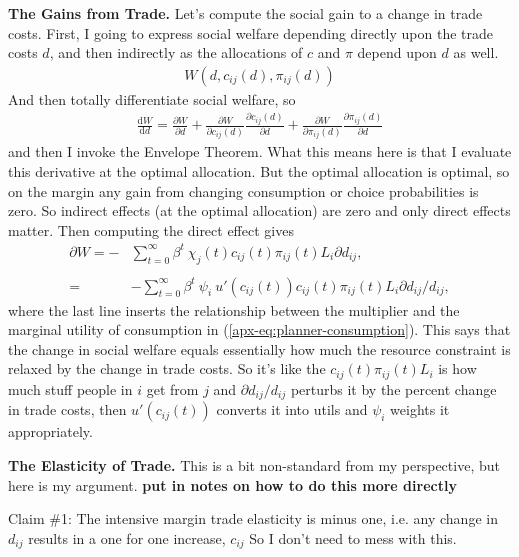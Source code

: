 \documentclass[12pt,pdftex]{article}
\begin{document}
\begin{onehalfspacing}
\textbf{The Gains from Trade.} Let's compute the social gain to a change in trade costs. First, I going to express social welfare depending directly upon the trade costs $d$, and then indirectly as the allocations of $c$ and $\pi$ depend upon $d$ as well.
\begin{align}
W(d, c_{ij}(d), \pi_{ij}(d))
\end{align}
And then totally differentiate social welfare, so
\begin{align}
\frac{\mathrm{d} W}{\mathrm{d}d} = \frac{\partial W}{\partial d} + \frac{\partial W}{\partial c_{ij}(d)}\frac{\partial c_{ij}(d)}{\partial d} + \frac{\partial W}{\partial \pi_{ij}(d)}\frac{\partial \pi_{ij}(d)}{\partial d}
\end{align}
and then I invoke the Envelope Theorem. What this means here is that I evaluate this derivative at the optimal allocation. But the optimal allocation is optimal, so on the margin any gain from changing consumption or choice probabilities is zero. So indirect effects (at the optimal allocation) are zero and only direct effects matter. Then computing the direct effect gives
\begin{align}
\partial W = - & \sum_{t=0}^{\infty} \beta^{t} \ \chi_{j}(t) c_{ij}(t) \pi_{ij}(t) L_{i} \partial d_{ij}, \\
\nonumber \\
=& - \sum_{t=0}^{\infty} \beta^{t} \ \psi_{i} \ u'(c_{ij}(t)) c_{ij}(t) \pi_{ij}(t) L_{i} \partial d_{ij} / d_{ij},
\end{align}
where the last line inserts the relationship between the multiplier and the marginal utility of consumption in (\ref{apx-eq:planner-consumption}). This says that the change in social welfare equals essentially how much the resource constraint is relaxed by the change in trade costs. So it's like the $c_{ij}(t) \pi_{ij}(t) L_{i}$ is how much stuff people in $i$ get from $j$ and $\partial d_{ij} / d_{ij}$ perturbs it by the percent change in trade costs, then $u'(c_{ij}(t))$ converts it into utils and $\psi_{i}$ weights it appropriately.

\textbf{The Elasticity of Trade.} This is a bit non-standard from my perspective, but here is my argument. \textbf{put in notes on how to do this more directly}

Claim \#1: The intensive margin trade elasticity is minus one, i.e. any change in $d_{ij}$ results in a one for one increase, $c_{ij}$ So I don't need to mess with this.


\end{onehalfspacing}
\end{document}
